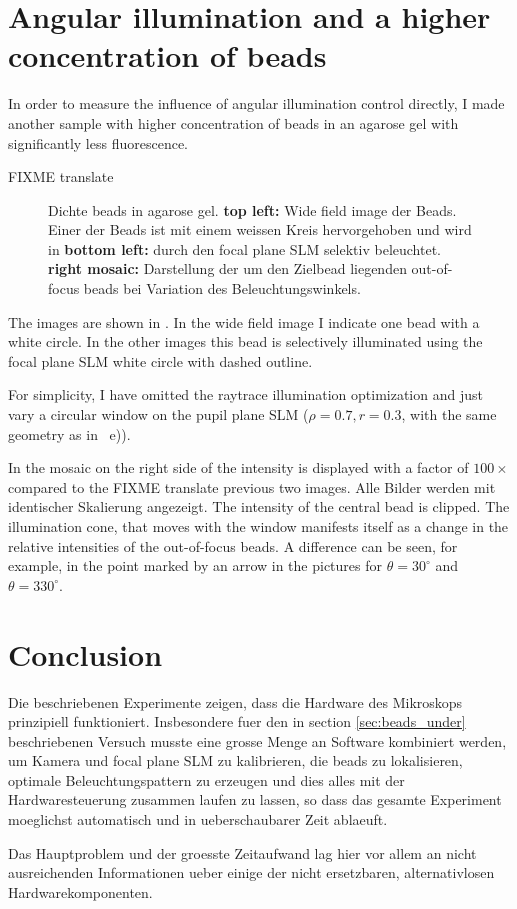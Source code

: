 \section{Angular illumination and a higher concentration of beads}
In order to measure the influence of angular illumination control
directly, I made another sample with higher concentration of beads in
an agarose gel with significantly less fluorescence.


FIXME translate
\begin{figure}[!hbt]
  \centering
  \caption{Dichte beads in agarose gel. {\bf top left:} Wide field
    image der Beads. Einer der Beads ist mit einem weissen Kreis
    hervorgehoben und wird in {\bf bottom left:} durch den focal plane
    SLM selektiv beleuchtet.  {\bf right mosaic:} Darstellung der um
    den Zielbead liegenden out-of-focus beads bei Variation des
    Beleuchtungswinkels.}
  \label{fig:montage-ang}
\end{figure}

The images are shown in . In the wide field
image I indicate one bead with a white circle. In the other images
this bead is selectively illuminated using the focal plane SLM white
circle with dashed outline.

For simplicity, I have omitted the raytrace illumination optimization
and just vary a circular window on the pupil plane SLM ($\rho=0.7,
r=0.3$, with the same geometry as in ~e)).


In the mosaic on the right side of  the
intensity is displayed with a factor of $100\times$ compared to the
FIXME translate previous two images. Alle Bilder werden mit
identischer Skalierung angezeigt. The intensity of the central bead is
clipped. The illumination cone, that moves with the window manifests
itself as a change in the relative intensities of the out-of-focus
beads. A difference can be seen, for example, in the point marked by
an arrow in the pictures for $\theta=30^\circ$ and $\theta=330^\circ$.

\section{Conclusion}
Die beschriebenen Experimente zeigen, dass die Hardware des Mikroskops
prinzipiell funktioniert.  Insbesondere fuer den in section
\ref{sec:beads_under} beschriebenen Versuch musste eine grosse Menge
an Software kombiniert werden, um Kamera und focal plane SLM zu
kalibrieren, die beads zu lokalisieren, optimale Beleuchtungspattern
zu erzeugen und dies alles mit der Hardwaresteuerung zusammen laufen
zu lassen, so dass das gesamte Experiment moeglichst automatisch und
in ueberschaubarer Zeit ablaeuft.

Das Hauptproblem und der groesste Zeitaufwand lag hier vor allem an
nicht ausreichenden Informationen ueber einige der nicht ersetzbaren,
alternativlosen Hardwarekomponenten.


